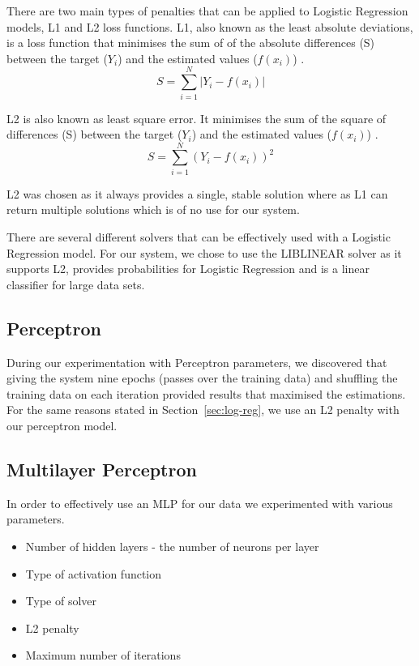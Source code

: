 \documentclass[bsc,frontabs,twoside,singlespacing,parskip,deptreport]{infthesis}     %
\begin{document}
 There are two main types of penalties that can be applied to Logistic Regression models, L1 and L2 loss functions.
 L1, also known as  the least absolute deviations, is a loss function that minimises the sum of of the absolute
 differences (S) between the target ($Y_i$) and the estimated values ($f(x_{i})$) \cite{l1l2}.
 \begin{equation}
   S = \sum_{i=1}^{N} | Y_i - f(x_i)|\nonumber
   \end{equation}
 
 L2 is also known as least square error. It minimises the sum of the square of differences (S) between
 the target ($Y_i$) and the estimated values ($f(x_{i})$) \cite{l1l2}.
 \begin{equation}
   S = \sum_{i=1}^{N} ( Y_i - f(x_i))^2\nonumber
   \end{equation}

 L2 was chosen as it always provides a single, stable solution where as L1 can return multiple solutions
 which is of no use for our system.

 There are several different solvers that can be effectively used with a Logistic Regression model.
 For our system, we chose to use the LIBLINEAR solver as it supports L2, provides probabilities
 for Logistic Regression and is a linear classifier for large data sets\cite{fan2008liblinear}.
 
 \subsection{Perceptron}
 During our experimentation with Perceptron parameters, we discovered that giving the system nine epochs (passes
 over the training data) and shuffling the training data on each iteration provided results that maximised the
 estimations. For the same reasons stated in Section~\ref{sec:log-reg}, we use an L2 penalty with our perceptron
 model.
 
 \subsection{Multilayer Perceptron}
 In order to effectively use an MLP for our data we experimented with various parameters.
 \begin{itemize}
 \item Number of hidden layers - the number of neurons per layer
 \item Type of activation function
 \item Type of solver
 \item L2 penalty
 \item Maximum number of iterations
 \end{itemize}
 
\end{document}

